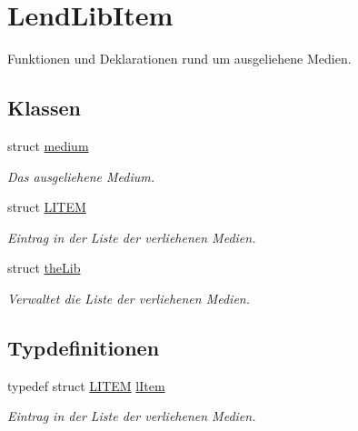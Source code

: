 \hypertarget{group___lend_lib_item}{}\section{Lend\+Lib\+Item}
\label{group___lend_lib_item}


Funktionen und Deklarationen rund um ausgeliehene Medien.  


\subsection*{Klassen}
\begin{DoxyCompactItemize}
\item 
struct \hyperlink{structmedium}{medium}
\begin{DoxyCompactList}\small\item\em Das ausgeliehene Medium. \end{DoxyCompactList}\item 
struct \hyperlink{struct_l_i_t_e_m}{L\+I\+T\+EM}
\begin{DoxyCompactList}\small\item\em Eintrag in der Liste der verliehenen Medien. \end{DoxyCompactList}\item 
struct \hyperlink{structthe_lib}{the\+Lib}
\begin{DoxyCompactList}\small\item\em Verwaltet die Liste der verliehenen Medien. \end{DoxyCompactList}\end{DoxyCompactItemize}
\subsection*{Typdefinitionen}
\begin{DoxyCompactItemize}
\item 
typedef struct \hyperlink{struct_l_i_t_e_m}{L\+I\+T\+EM} \hyperlink{group___lend_lib_item_ga307bf11439a9dddcff69d464ae8df92b}{l\+Item}\hypertarget{group___lend_lib_item_ga307bf11439a9dddcff69d464ae8df92b}{}\label{group___lend_lib_item_ga307bf11439a9dddcff69d464ae8df92b}

\begin{DoxyCompactList}\small\item\em Eintrag in der Liste der verliehenen Medien. \end{DoxyCompactList}\end{DoxyCompactItemize}
